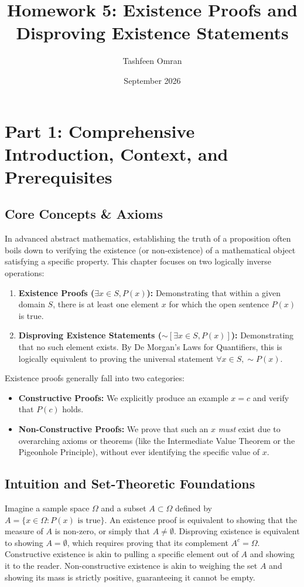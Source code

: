 \documentclass[11pt, a4paper]{article}
\title{\textbf{Homework 5: Existence Proofs and Disproving Existence Statements}}
\author{Tashfeen Omran}
\date{September 2026}
\theoremstyle{definition}
\theoremstyle{remark}
\begin{document}
\maketitle
\tableofcontents
\newpage

\section{Part 1: Comprehensive Introduction, Context, and Prerequisites}

\subsection{Core Concepts \& Axioms}
In advanced abstract mathematics, establishing the truth of a proposition often boils down to verifying the existence (or non-existence) of a mathematical object satisfying a specific property. This chapter focuses on two logically inverse operations:
\begin{enumerate}
    \item \textbf{Existence Proofs ($\exists x \in S, P(x)$):} Demonstrating that within a given domain $S$, there is at least one element $x$ for which the open sentence $P(x)$ is true.
    \item \textbf{Disproving Existence Statements ($\sim[\exists x \in S, P(x)]$):} Demonstrating that no such element exists. By De Morgan's Laws for Quantifiers, this is logically equivalent to proving the universal statement $\forall x \in S, \sim P(x)$.
\end{enumerate}

Existence proofs generally fall into two categories:
\begin{itemize}
    \item \textbf{Constructive Proofs:} We explicitly produce an example $x = c$ and verify that $P(c)$ holds.
    \item \textbf{Non-Constructive Proofs:} We prove that such an $x$ \textit{must} exist due to overarching axioms or theorems (like the Intermediate Value Theorem or the Pigeonhole Principle), without ever identifying the specific value of $x$.
\end{itemize}

\subsection{Intuition and Set-Theoretic Foundations}
Imagine a sample space $\Omega$ and a subset $A \subset \Omega$ defined by $A = \{x \in \Omega : P(x) \text{ is true}\}$. 
An existence proof is equivalent to showing that the measure of $A$ is non-zero, or simply that $A \neq \emptyset$. Disproving existence is equivalent to showing $A = \emptyset$, which requires proving that its complement $A^c = \Omega$. Constructive existence is akin to pulling a specific element out of $A$ and showing it to the reader. Non-constructive existence is akin to weighing the set $A$ and showing its mass is strictly positive, guaranteeing it cannot be empty.
\end{document}

